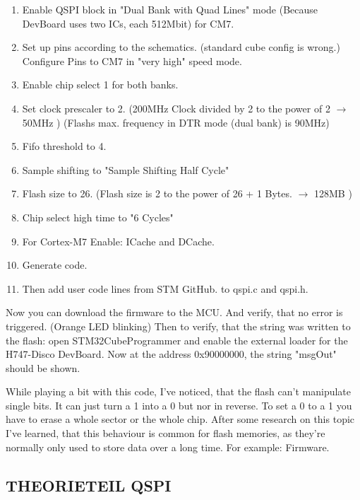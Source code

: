 \begin{enumerate}
	\item Enable QSPI block in "Dual Bank with Quad Lines" mode (Because DevBoard uses two ICs, each 512Mbit) for CM7.
	\item Set up pins according to the schematics. (standard cube config is wrong.) Configure Pins to CM7 in "very high" speed mode.
	\item Enable chip select 1 for both banks.
	\item Set clock prescaler to 2. (200MHz Clock divided by 2 to the power of 2 \(\rightarrow\) 50MHz ) (Flashs max. frequency in DTR mode (dual bank) is 90MHz)
	\item Fifo threshold to 4.
	\item Sample shifting to "Sample Shifting Half Cycle"
	\item Flash size to 26. (Flash size is 2 to the power of 26 + 1 Bytes. \(\rightarrow\) 128MB )
	\item Chip select high time to "6 Cycles"
	\item For Cortex-M7 Enable: ICache and DCache.
	\item Generate code.
	\item Then add user code lines from STM GitHub. \cite{GIT_DRIVER_QSPI_FLASH} to qspi.c and qspi.h.
\end{enumerate}

Now you can download the firmware to the MCU. And verify, that no error is triggered. (Orange LED blinking) Then to verify, that the string was written to the flash: open STM32CubeProgrammer and enable the external loader for the H747-Disco DevBoard. Now at the address 0x90000000, the string "msgOut" should be shown.

\begin{codeblock}
	
\end{codeblock}

While playing a bit with this code, I've noticed, that the flash can't manipulate single bits. It can just turn a 1 into a 0 but nor in reverse. To set a 0 to a 1 you have to erase a whole sector or the whole chip. After some research on this topic I've learned, that this behaviour is common for flash memories, as they're normally only used to store data over a long time. For example: Firmware.


\subsection{THEORIETEIL QSPI}